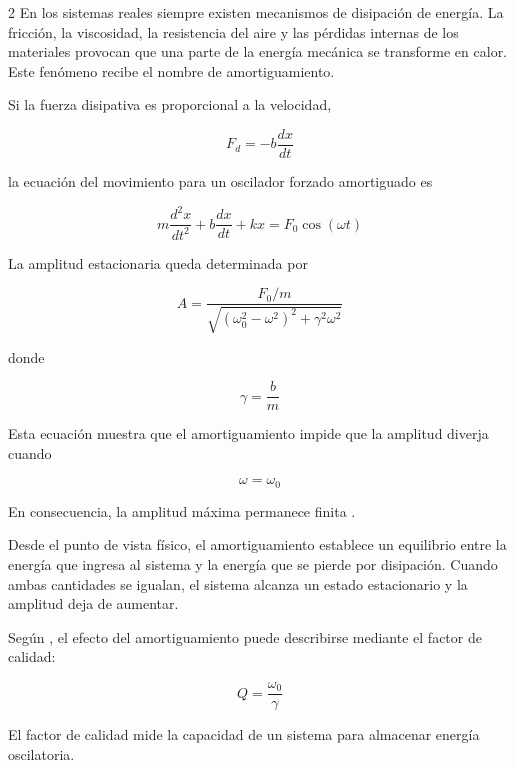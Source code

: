 \documentclass[10pt]{article}
\begin{document}
\begin{multicols}{2}
En los sistemas reales siempre existen mecanismos de disipación de energía. La fricción, la viscosidad, la resistencia del aire y las pérdidas internas de los materiales provocan que una parte de la energía mecánica se transforme en calor. Este fenómeno recibe el nombre de amortiguamiento.

Si la fuerza disipativa es proporcional a la velocidad,

\begin{equation}
F_{d}=-b\frac{dx}{dt}
\end{equation}

la ecuación del movimiento para un oscilador forzado amortiguado es

\begin{equation}
m\frac{d^{2}x}{dt^{2}}+b\frac{dx}{dt}+kx=F_{0}\cos(\omega t)
\end{equation}

La amplitud estacionaria queda determinada por

\begin{equation}
A=
\frac{F_{0}/m}
{\sqrt{(\omega_{0}^{2}-\omega^{2})^{2}+\gamma^{2}\omega^{2}}}
\end{equation}

donde

\begin{equation}
\gamma=\frac{b}{m}
\end{equation}

Esta ecuación muestra que el amortiguamiento impide que la amplitud diverja cuando

\begin{equation}
\omega=\omega_{0}
\end{equation}

En consecuencia, la amplitud máxima permanece finita \citep{Peralta2009}.

Desde el punto de vista físico, el amortiguamiento establece un equilibrio entre la energía que ingresa al sistema y la energía que se pierde por disipación. Cuando ambas cantidades se igualan, el sistema alcanza un estado estacionario y la amplitud deja de aumentar.

Según \citet{Tipler2008}, el efecto del amortiguamiento puede describirse mediante el factor de calidad:

\begin{equation}
Q=\frac{\omega_{0}}{\gamma}
\end{equation}

El factor de calidad mide la capacidad de un sistema para almacenar energía oscilatoria.


\end{multicols}
\end{document}
